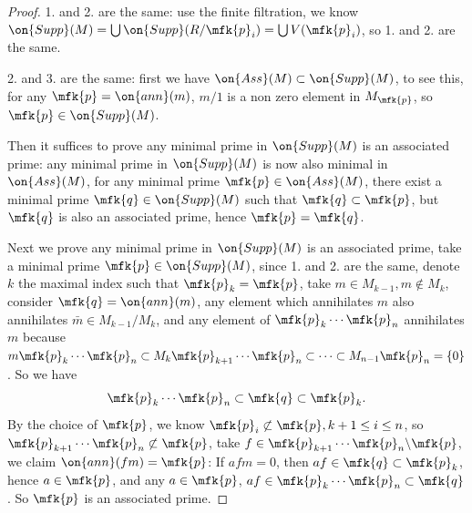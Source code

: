 \begin{proof}
	1. and 2. are the same:	use the finite filtration, we know $\on{Supp}(M)=\bigcup\on{Supp}(R/\mfk{p}_i)=\bigcup V(\mfk{p}_i)$, so 1. and 2. are the same.
	
	2. and 3. are the same: first we have $\on{Ass}(M)\subset\on{Supp}(M)$, to see this, for any $\mfk{p}=\on{ann}(m)$, $m/1$ is a non zero element in $M_\mfk{p}$, so $\mfk{p}\in\on{Supp}(M)$.
	
	Then it suffices to prove any minimal prime in $\on{Supp}(M)$ is an associated prime: any minimal prime in $\on{Supp}(M)$ is now also minimal in $\on{Ass}(M)$, for any minimal prime $\mfk{p}\in\on{Ass}(M)$, there exist a minimal prime $\mfk{q}\in\on{Supp}(M)$ such that $\mfk{q}\subset\mfk{p}$, but $\mfk{q}$ is also an associated prime, hence $\mfk{p}=\mfk{q}$.
	
	Next we prove any minimal prime in $\on{Supp}(M)$ is an associated prime, take a minimal prime $\mfk{p}\in\on{Supp}(M)$, since 1. and 2. are the same, denote $k$ the maximal index such that $\mfk{p}_k=\mfk{p}$, take $m\in M_{k-1}, m\notin M_k$, consider $\mfk{q}=\on{ann}(m)$, any element which annihilates $m$ also annihilates $\bar{m}\in M_{k-1}/M_k$, and any element of $\mfk{p}_{k}\cdots \mfk{p}_n$ annihilates $m$ because $m\mfk{p}_{k}\cdots \mfk{p}_n\subset M_k\mfk{p}_{k+1}\cdots \mfk{p}_n\subset \cdots\subset M_{n-1}\mfk{p}_n=\{0\}$. So we have
	$$
	\mfk{p}_{k}\cdots \mfk{p}_n\subset\mfk{q}\subset\mfk{p}_k.
	$$
	By the choice of $\mfk{p}$, we know $\mfk{p}_i\not\subset\mfk{p}, k+1\leq i\leq n$, so $\mfk{p}_{k+1}\cdots \mfk{p}_n\not\subset\mfk{p}$, take $f\in\mfk{p}_{k+1}\cdots \mfk{p}_n\backslash\mfk{p}$, we claim $\on{ann}(fm)=\mfk{p}$: If $afm=0$, then $af\in\mfk{q}\subset\mfk{p}_k$, hence $a\in\mfk{p}$, and any $a\in\mfk{p}$, $af\in\mfk{p}_{k}\cdots \mfk{p}_n\subset\mfk{q}$. So $\mfk{p}$ is an associated prime.
\end{proof}

